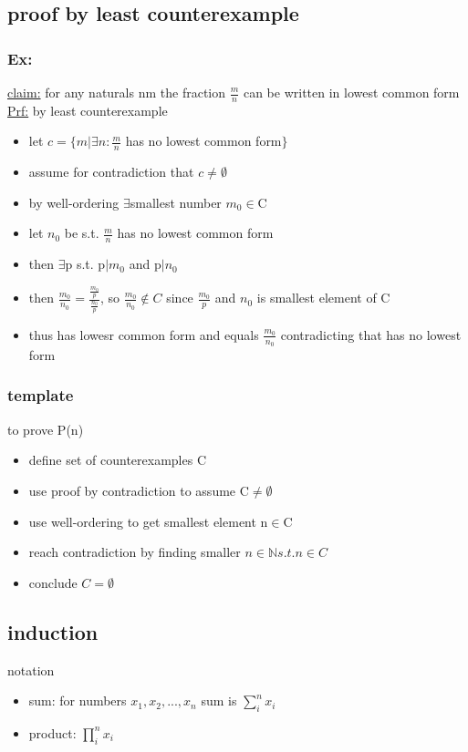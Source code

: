 \documentclass[a4paper]{article}
\newcommand{\te}{$\exists$}
\newcommand{\bi}{\begin{itemize}}
\newcommand{\ei}{\end{itemize}}
\begin{document}
\begin{itemize}
    \subsection{proof by least counterexample}
      \subsubsection{Ex:}
        \underline{claim:} for any naturals nm the fraction $\frac{m}{n}$ can be written in lowest common form\\
        \underline{Prf:} by least counterexample
        \bi
          \item let $c = \{ m|\exists n : \frac{m}{n}$ has no lowest common form$\}$
          \item assume for contradiction that $c\neq \emptyset$
          \item by well-ordering \te smallest number $m_0\in$C
          \item let $n_0$ be s.t. $\frac{m}{n}$ has no lowest common form
          \item then \te p s.t. p$|m_0$ and p$|n_0$
          \item then $\frac{m_0}{n_0} = \frac{\frac{m_0}{p}}{\frac{n_0}{p}}$, so $\frac{m_0}{n_0}\notin C$ since $\frac{m_0}{p}$ and $n_0$ is smallest element of C
          \item thus has lowesr common form and equals $\frac{m_0}{n_0}$ contradicting that has no lowest form
        \ei
      \subsubsection{template}
        to prove P(n)
        \bi
          \item define set of counterexamples C
          \item use proof by contradiction to assume C$\neq\emptyset$
          \item use well-ordering to get smallest element n$\in$C
          \item reach contradiction by finding smaller $n\in \mathbb{N} s.t. n\in C$
          \item conclude $C=\emptyset$
        \ei
    \subsection{induction}
      notation
      \bi
        \item sum: for numbers $x_1,x_2,...,x_n$ sum is $\sum_i^n x_i$
        \item product: $\prod_i^n x_i$
      \ei

\end{itemize}
\end{document}
